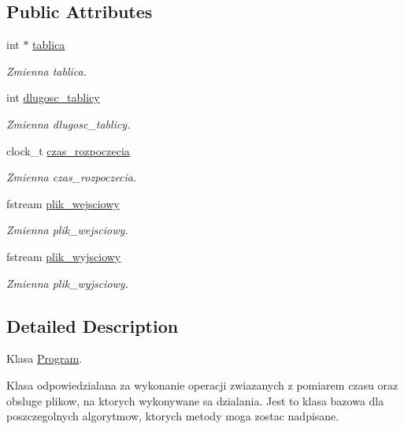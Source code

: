 \subsection*{Public Attributes}
\begin{DoxyCompactItemize}
\item 
int $\ast$ \hyperlink{class_program_ad716e08410eb11cfd01ece6c459c1de1}{tablica}
\begin{DoxyCompactList}\small\item\em Zmienna tablica. \end{DoxyCompactList}\item 
int \hyperlink{class_program_a7edd77bb13eb767fcbcabd5f2a4ae468}{dlugosc\-\_\-tablicy}
\begin{DoxyCompactList}\small\item\em Zmienna dlugosc\-\_\-tablicy. \end{DoxyCompactList}\item 
clock\-\_\-t \hyperlink{class_program_a8cdcc795adc329732f41b399044d0a5b}{czas\-\_\-rozpoczecia}
\begin{DoxyCompactList}\small\item\em Zmienna czas\-\_\-rozpoczecia. \end{DoxyCompactList}\item 
fstream \hyperlink{class_program_a532ceacb1d70da66142bab96a3eb0753}{plik\-\_\-wejsciowy}
\begin{DoxyCompactList}\small\item\em Zmienna plik\-\_\-wejsciowy. \end{DoxyCompactList}\item 
fstream \hyperlink{class_program_aaa305591a4333d799c8d353f3072d8e0}{plik\-\_\-wyjsciowy}
\begin{DoxyCompactList}\small\item\em Zmienna plik\-\_\-wyjsciowy. \end{DoxyCompactList}\end{DoxyCompactItemize}


\subsection{Detailed Description}
Klasa \hyperlink{class_program}{Program}. 

Klasa odpowiedzialana za wykonanie operacji zwiazanych z pomiarem czasu oraz obsluge plikow, na ktorych wykonywane sa dzialania. Jest to klasa bazowa dla poszczegolnych algorytmow, ktorych metody moga zostac nadpisane. 

